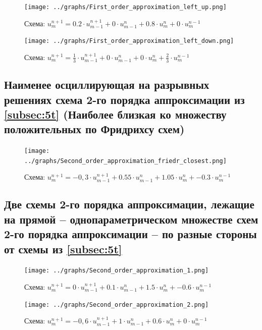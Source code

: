\documentclass[a4paper, 12pt]{article} %
\begin{document}
\begin{figure}[h!]
    \centering
    \texttt{[image: ../graphs/First\_order\_approximation\_left\_up.png]}
    \caption{Схема: $u^{n+1}_{m} = 0.2 \cdot u^{n+1}_{m-1} + 0 \cdot u^{n}_{m-1} + 0.8 \cdot u^{n}_{m} + 0 \cdot u^{n-1}_{m}$}
    \label{fig:vac}
\end{figure} 

\newpage
\begin{figure}[h!]
    \centering
    \texttt{[image: ../graphs/First\_order\_approximation\_left\_down.png]}
    \caption{Схема: $u^{n+1}_{m} = \frac{1}{3} \cdot u^{n+1}_{m-1} + 0 \cdot u^{n}_{m-1} + 0 \cdot u^{n}_{m} + \frac{2}{3} \cdot u^{n-1}_{m}$}
    \label{fig:vac}
\end{figure} 

\newpage
\subsection{Наименее осциллирующая на разрывных решениях схема 2-го порядка аппроксимации из \ref{subsec:5t} (Наиболее близкая ко множеству положительных по Фридрихсу схем)}
\label{subsec:2p}
\begin{figure}[h!]
    \centering
    \texttt{[image: ../graphs/Second\_order\_approximation\_friedr\_closest.png]}
    \caption{Схема: $u^{n+1}_{m} = -0,3 \cdot u^{n+1}_{m-1} + 0.55 \cdot u^{n}_{m-1} + 1.05 \cdot u^{n}_{m} + -0.3 \cdot u^{n-1}_{m}$ \\ }
    \label{fig:vac}
\end{figure} 

\newpage
\subsection{Две схемы 2-го порядка аппроксимации, лежащие на прямой – однопараметрическом множестве схем 2-го порядка аппроксимации – по разные стороны от схемы из \ref{subsec:5t}}
\label{subsec:3p}
\begin{figure}[h!]
    \centering
    \texttt{[image: ../graphs/Second\_order\_approximation\_1.png]}
    \caption{Схема: $u^{n+1}_{m} = 0 \cdot u^{n+1}_{m-1} + 0.1 \cdot u^{n}_{m-1} + 1.5 \cdot u^{n}_{m} + -0.6 \cdot u^{n-1}_{m}$ \\ }
    \label{fig:vac}
\end{figure} 

\newpage
\begin{figure}[h!]
    \centering
    \texttt{[image: ../graphs/Second\_order\_approximation\_2.png]}
    \caption{Схема: $u^{n+1}_{m} = -0,6 \cdot u^{n+1}_{m-1} + 1 \cdot u^{n}_{m-1} + 0.6 \cdot u^{n}_{m} + 0 \cdot u^{n-1}_{m}$ \\ }
    \label{fig:vac}
\end{figure} 
\end{document}
